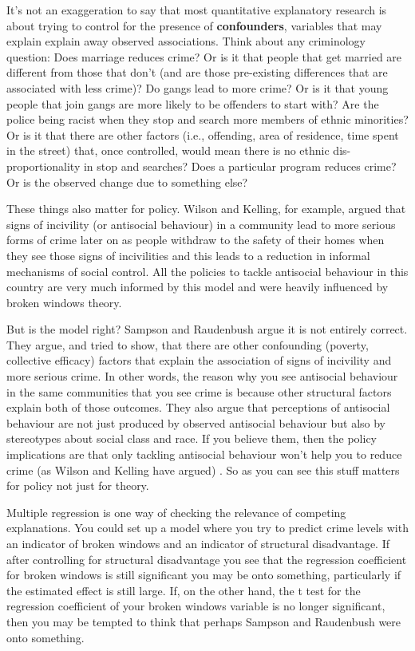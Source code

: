 \documentclass[
]{book}
\begin{document}
It's not an exaggeration to say that most quantitative explanatory research is about trying to control for the presence of \textbf{confounders}, variables that may explain explain away observed associations. Think about any criminology question: Does marriage reduces crime? Or is it that people that get married are different from those that don't (and are those pre-existing differences that are associated with less crime)? Do gangs lead to more crime? Or is it that young people that join gangs are more likely to be offenders to start with? Are the police being racist when they stop and search more members of ethnic minorities? Or is it that there are other factors (i.e., offending, area of residence, time spent in the street) that, once controlled, would mean there is no ethnic dis-proportionality in stop and searches? Does a particular program reduces crime? Or is the observed change due to something else?

These things also matter for policy. Wilson and Kelling, for example, argued that signs of incivility (or antisocial behaviour) in a community lead to more serious forms of crime later on as people withdraw to the safety of their homes when they see those signs of incivilities and this leads to a reduction in informal mechanisms of social control. All the policies to tackle antisocial behaviour in this country are very much informed by this model and were heavily influenced by broken windows theory.

But is the model right? Sampson and Raudenbush argue it is not entirely correct. They argue, and tried to show, that there are other confounding (poverty, collective efficacy) factors that explain the association of signs of incivility and more serious crime. In other words, the reason why you see antisocial behaviour in the same communities that you see crime is because other structural factors explain both of those outcomes. They also argue that perceptions of antisocial behaviour are not just produced by observed antisocial behaviour but also by stereotypes about social class and race. If you believe them, then the policy implications are that only tackling antisocial behaviour won't help you to reduce crime (as Wilson and Kelling have argued) . So as you can see this stuff matters for policy not just for theory.

Multiple regression is one way of checking the relevance of competing explanations. You could set up a model where you try to predict crime levels with an indicator of broken windows and an indicator of structural disadvantage. If after controlling for structural disadvantage you see that the regression coefficient for broken windows is still significant you may be onto something, particularly if the estimated effect is still large. If, on the other hand, the t test for the regression coefficient of your broken windows variable is no longer significant, then you may be tempted to think that perhaps Sampson and Raudenbush were onto something.
\end{document}
